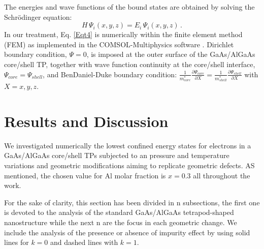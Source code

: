 \documentclass[nanomaterials,article,submit,moreauthors,pdftex]{Definitions/mdpi}
\begin{document}
The energies and wave functions of the bound states are obtained by solving the Schrödinger equation:
\begin{equation} \label{Eqt4}
	H\,\Psi_{i}(x,y,z)=E_{i}\,\Psi_{i}(x,y,z)\,.
\end{equation}
In our treatment,  Eq. \ref{Eqt4} is numerically within the finite element method (FEM) as implemented in the COMSOL-Multiphysics software \cite{COMSOL}. Dirichlet boundary condition, $\Psi = 0$, is imposed at the outer surface of the GaAs/AlGaAs core/shell TP, together with wave function continuity at the core/shell interface, $\Psi_{core} = \Psi_{shell}$, and  BenDaniel-Duke boundary condition: $\frac{1}{m_{core}^{*}}\frac{\partial\Psi_{core}}{\partial X}=\frac{1}{m_{shell}^{*}}\frac{\partial\Psi_{shell}}{\partial X}$ with $X=x, y, z$.
\\

\section{Results and Discussion} \label{results}
We investigated numerically the lowest confined energy states for electrons in a GaAs/AlGaAs core/shell TPs subjected to an pressure and temperature variations and geometric modifications aiming to replicate geometric defects. AS mentioned, the chosen value for Al molar fraction is $x=0.3$ all throughout the work.

For the sake of clarity, this section has been divided in n subsections, the first one is devoted to the analysis of the standard GaAs/AlGaAs tetrapod-shaped nanostructure while the next n are the focus in each geometric change. We include the analysis of the presence or absence of impurity effect by using solid lines for $k=0$ and dashed lines with $k=1$.
\end{document}
